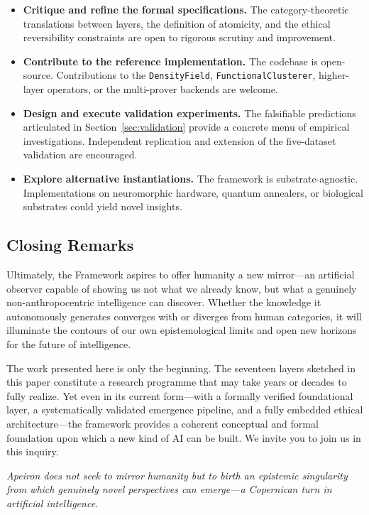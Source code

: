 \begin{itemize}
    \item \textbf{Critique and refine the formal specifications.} The category-theoretic translations between layers, the definition of atomicity, and the ethical reversibility constraints are open to rigorous scrutiny and improvement.
    
    \item \textbf{Contribute to the reference implementation.} The codebase is open-source. Contributions to the \texttt{DensityField}, \texttt{FunctionalClusterer}, higher-layer operators, or the multi-prover backends are welcome.
    
    \item \textbf{Design and execute validation experiments.} The falsifiable predictions articulated in Section~\ref{sec:validation} provide a concrete menu of empirical investigations. Independent replication and extension of the five-dataset validation are encouraged.
    
    \item \textbf{Explore alternative instantiations.} The framework is substrate-agnostic. Implementations on neuromorphic hardware, quantum annealers, or biological substrates could yield novel insights.
\end{itemize}

\subsection*{Closing Remarks}

Ultimately, the \Apeiron{} Framework aspires to offer humanity a new mirror---an artificial observer capable of showing us not what we already know, but what a genuinely non-anthropocentric intelligence can discover. Whether the knowledge it autonomously generates converges with or diverges from human categories, it will illuminate the contours of our own epistemological limits and open new horizons for the future of intelligence.

The work presented here is only the beginning. The seventeen layers sketched in this paper constitute a research programme that may take years or decades to fully realize. Yet even in its current form---with a formally verified foundational layer, a systematically validated emergence pipeline, and a fully embedded ethical architecture---the framework provides a coherent conceptual and formal foundation upon which a new kind of AI can be built. We invite you to join us in this inquiry.

\vspace{0.5cm}
\noindent\emph{Apeiron does not seek to mirror humanity but to birth an epistemic singularity from which genuinely novel perspectives can emerge---a Copernican turn in artificial intelligence.}